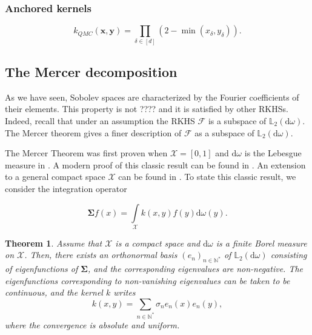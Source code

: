 \documentclass[twoside,11pt]{book}
\newtheorem{theorem}{Theorem}
\begin{document}
\subsubsection{Anchored kernels}

\begin{equation}
k_{QMC}(\bm{x},\bm{y}) = \prod\limits_{\delta \in [d]} (2-\min(x_{\delta},y_{\delta})).
\end{equation}


\subsection{The Mercer decomposition}
\label{subsec:mercer}
As we have seen, Sobolev spaces are characterized by the Fourier coefficients of their elements. This property is not ???? and it is satisfied by other RKHSs. Indeed, recall that under an assumption the RKHS $\mathcal{F}$ is a subspace of $\mathbb{L}_{2}(\mathrm{d}\omega)$. The Mercer theorem gives a finer description of $\mathcal{F}$ as a subspace of $\mathbb{L}_{2}(\mathrm{d}\omega)$.



The Mercer Theorem was first proven when $\mathcal{X} = [0,1]$ and $\mathrm{d}\omega$ is the Lebesgue measure in \cite{Mer1909}.
A modern proof of this classic result can be found in \cite{Lax02}. An extension to a general compact space $\mathcal{X}$ can be  found in \cite{CuZh07}. To state this classic result, we consider the integration operator

\begin{equation}
\bm{\Sigma} f(x) = \int\limits_{\mathcal{X}} k(x,y)f(y) \mathrm{d}\omega(y).
\end{equation}
\begin{theorem}\label{thm:Mercer_for_compact}
Assume that $\mathcal{X}$ is a compact space and $\mathrm{d}\omega$ is a finite Borel measure on $\mathcal{X}$.
Then, there exists an orthonormal basis $(e_{n})_{n \in \mathbb{N}^{*}}$ of $\mathbb{L}_{2}(\mathrm{d}\omega)$ consisting of eigenfunctions of $\bm{\Sigma}$, and the corresponding eigenvalues are non-negative.
The eigenfunctions corresponding to non-vanishing eigenvalues can be taken to be continuous, and the kernel $k$ writes
\begin{equation}
k(x,y) = \sum\limits_{n \in \mathbb{N}^{*}} \sigma_{n} e_{n}(x)e_{n}(y),
\end{equation}
where the convergence is absolute and uniform.
\end{theorem}
\end{document}

